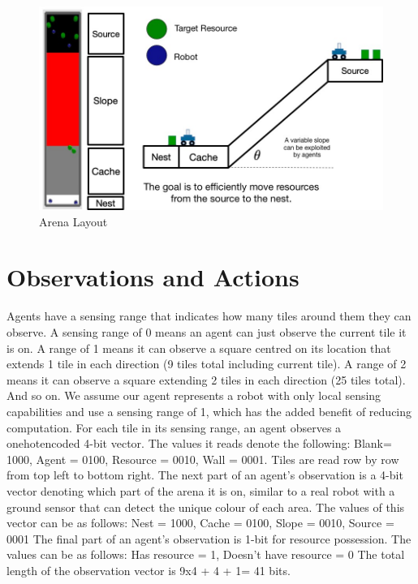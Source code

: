 \documentclass[12pt]{article}
\begin{document}
\begin{figure}
	\centering
	\includegraphics[width=\textwidth]{arena.jpg}
	\caption{Arena Layout}
	\label{fig:arena}
\end{figure}

\section{Observations and Actions}

Agents have a sensing range that indicates how many tiles around them they can observe. 
A sensing range of 0 means an agent can just observe the current tile it is on. 
A range of 1 means it can observe a square centred  on its location that extends 1 tile in each direction (9 tiles total including current tile). 
A range of 2 means it can observe a square extending 2 tiles in each direction (25 tiles total). 
And so on.
We assume our agent represents a robot with only local sensing capabilities and use a sensing range of 1, which has the added benefit of reducing computation.
For each tile in its sensing range, an agent observes a onehotencoded 4-bit vector. 
The values it reads denote the following: Blank= 1000, Agent = 0100, Resource = 0010, Wall = 0001.
Tiles are read row by row from top left to bottom right. 
The next part of an agent's observation is a 4-bit vector denoting which part of the arena it is on, similar to a real robot with a ground sensor that can detect the unique colour of each area.
The values of this vector can be as follows: Nest = 1000, Cache = 0100, Slope = 0010, Source = 0001
The final part of an agent's observation is 1-bit for resource possession. 
The values can be as follows: Has resource = 1, Doesn’t have resource = 0
The total length of the observation vector is 9x4 + 4 + 1= 41 bits.\\
\end{document}
